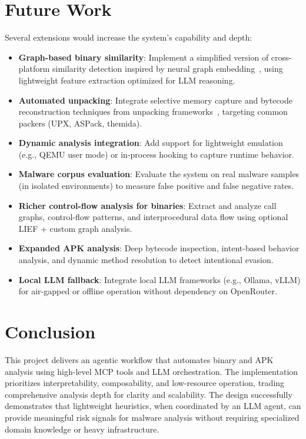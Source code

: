 \documentclass[11pt]{article}
\begin{document}
\section{Future Work}
Several extensions would increase the system's capability and depth:
\begin{itemize}[leftmargin=*]
  \item \textbf{Graph-based binary similarity}: Implement a simplified version of cross-platform similarity detection inspired by neural graph embedding~\cite{gemini2018}, using lightweight feature extraction optimized for LLM reasoning.
  \item \textbf{Automated unpacking}: Integrate selective memory capture and bytecode reconstruction techniques from unpacking frameworks~\cite{polyunpack2007}, targeting common packers (UPX, ASPack, themida).
  \item \textbf{Dynamic analysis integration}: Add support for lightweight emulation (e.g., QEMU user mode) or in-process hooking to capture runtime behavior.
  \item \textbf{Malware corpus evaluation}: Evaluate the system on real malware samples (in isolated environments) to measure false positive and false negative rates.
  \item \textbf{Richer control-flow analysis for binaries}: Extract and analyze call graphs, control-flow patterns, and interprocedural data flow using optional LIEF + custom graph analysis.
  \item \textbf{Expanded APK analysis}: Deep bytecode inspection, intent-based behavior analysis, and dynamic method resolution to detect intentional evasion.
  \item \textbf{Local LLM fallback}: Integrate local LLM frameworks (e.g., Ollama, vLLM) for air-gapped or offline operation without dependency on OpenRouter.
\end{itemize}

\section{Conclusion}
This project delivers an agentic workflow that automates binary and APK analysis using high-level MCP tools and LLM orchestration. The implementation prioritizes interpretability, composability, and low-resource operation, trading comprehensive analysis depth for clarity and scalability. The design successfully demonstrates that lightweight heuristics, when coordinated by an LLM agent, can provide meaningful risk signals for malware analysis without requiring specialized domain knowledge or heavy infrastructure.
\end{document}
